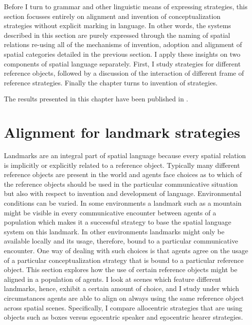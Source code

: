 Before I turn to grammar and other 
linguistic means of expressing strategies, this section focusses entirely 
on alignment and invention of conceptualization strategies 
without explicit marking in language. In other words, the systems described in
this section are purely expressed through the naming of spatial relations
re-using all of the mechanisms of invention, adoption and alignment of
spatial categories detailed in the previous section. I apply these
insights on two components of spatial language separately. First,
I study strategies for different reference objects, followed by a discussion of 
the interaction of different frame of reference strategies. Finally the chapter
turns to invention of strategies.

The results presented in this chapter have been published in 
\cite{spranger2011recruitment,spranger2013evolving}.

\section{Alignment for landmark strategies}
Landmarks are an integral part of spatial language
because every spatial relation is implicitly or explicitly related to a reference object.
Typically many different reference objects are present in the world and agents
face choices as to which of the reference objects should be used
in the particular communicative situation but also with respect to invention
and development of language. Environmental conditions can be varied.
In some environments a landmark such as a mountain might be visible in every communicative
encounter between agents of a population which makes it a successful strategy to 
base the spatial language system on this landmark. In other environments
landmarks might only be available locally and its usage, therefore, bound to a particular
communicative encounter. One way of dealing with such choices is that
agents agree on the usage of a particular conceptualization strategy that is 
bound to a particular reference object. This section explores how the use of certain 
reference objects might be aligned in a population of agents. I look at scenes
which feature different landmarks, hence, exhibit a certain amount of choice,
and I study under which circumstances agents are able to align on always using 
the same reference object across spatial scenes. Specifically,
I compare allocentric strategies that are using objects such as boxes
versus egocentric speaker and egocentric hearer strategies. 

